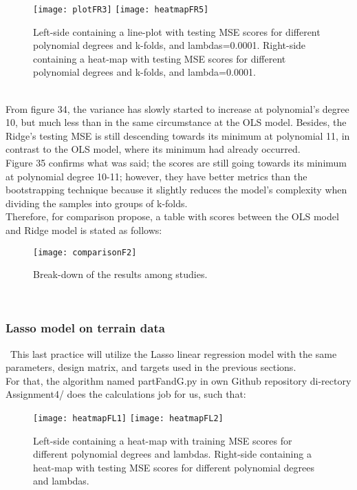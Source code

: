 \begin{figure}[H]
\label{fig:plotFR3andH5}
\centering
\texttt{[image: plotFR3]}
\texttt{[image: heatmapFR5]}
\caption{Left-side containing a line-plot with testing MSE scores for different polynomial degrees and k-folds, and lambdas=0.0001. Right-side containing a heat-map with testing MSE scores for different polynomial degrees and k-folds, and lambda=0.0001.}
\end{figure}\\

From figure 34, the variance has slowly started to increase at polynomial's degree 10, but much less than in the same circumstance at the OLS model. Besides, the Ridge's testing MSE is still descending towards its minimum at polynomial 11, in contrast to the OLS model, where its minimum had already occurred. \\

Figure 35 confirms what was said; the scores are still going towards its minimum at polynomial degree 10-11; however, they have better metrics than the bootstrapping technique because it slightly reduces the model's complexity when dividing the samples into groups of k-folds. \\

Therefore, for comparison propose, a table with scores between the OLS model and Ridge model is stated as follows: \\

\begin{figure}[H]
\label{fig:comparisonF2}
\centering
\texttt{[image: comparisonF2]}
\caption{Break-down of the results among studies.}
\end{figure}\\

\subsubsection{Lasso model on terrain data}
\label{chap:Lasso model on terrain data}

\quad \, This last practice will utilize the Lasso linear regression model with the same parameters, design matrix, and targets used in the previous sections. \\

For that, the algorithm named partFandG.py in own Github repository di-rectory Assignment4/ does the calculations job for us, such that: \\

\begin{figure}[H]
\label{fig:heatmapFL1and2}
\centering
\texttt{[image: heatmapFL1]}
\texttt{[image: heatmapFL2]}
\caption{Left-side containing a heat-map with training MSE scores for different polynomial degrees and lambdas. Right-side containing a heat-map with testing MSE scores for different polynomial degrees and lambdas.}
\end{figure}\\

